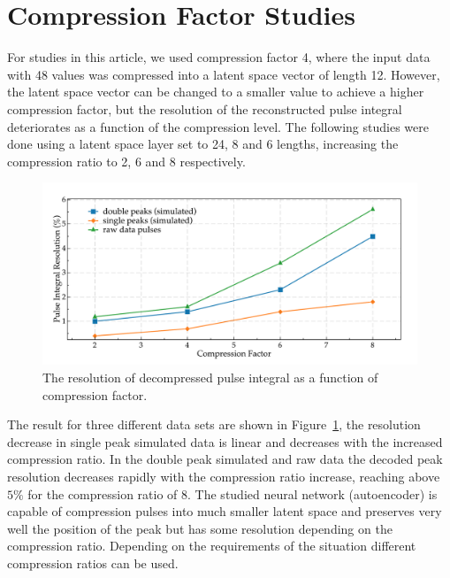 \section{Compression Factor Studies}

For studies in this article, we used compression factor 4, where the input data with 48 values was compressed into a latent space vector of length 12. However, the 
latent space vector can be changed to a smaller value to achieve a higher compression factor, but the resolution of the reconstructed pulse integral deteriorates as 
a function of the compression level. The following studies were done using a latent space layer set to 24, 8 and 6 lengths, increasing the compression ratio to 2, 6 and 8 respectively.

\begin{figure}[h!]
\centering
\includegraphics[width=0.95\columnwidth]{cfactor_summary.pdf}
\caption{The resolution of decompressed pulse integral as a function of compression factor.} 
\label{fig:compression_factor_summary}
\end{figure}

The result for three different data sets are shown in Figure~\ref{fig:compression_factor_summary}, the resolution decrease in single peak simulated data is linear and decreases with the increased compression ratio. In the double peak simulated and raw data the decoded peak resolution decreases rapidly with the compression ratio increase, reaching above $5\%$ for the compression ratio of 8.
The studied neural network (autoencoder) is capable of compression pulses into much smaller latent space and preserves very well the position of the peak but has some resolution depending on the compression ratio. Depending on the requirements of the situation different compression ratios can be used.
